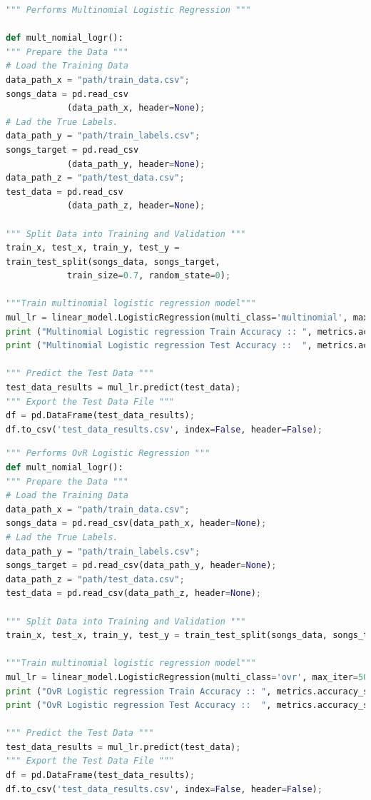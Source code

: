\documentclass[journal]{IEEEtran}
\begin{document}
\begin{lstlisting}[language=Python, caption = Multinomial LogisticRegression]
""" Performs Multinomial Logistic Regression """

def mult_nomial_logr():
""" Prepare the Data """
# Load the Training Data
data_path_x = "path/train_data.csv";
songs_data = pd.read_csv
			(data_path_x, header=None);
# Lad the True Labels.
data_path_y = "path/train_labels.csv";
songs_target = pd.read_csv
			(data_path_y, header=None);
data_path_z = "path/test_data.csv";
test_data = pd.read_csv
			(data_path_z, header=None);

""" Split Data into Training and Validation """
train_x, test_x, train_y, test_y = 
train_test_split(songs_data, songs_target, 
			train_size=0.7, random_state=0);

"""Train multinomial logistic regression model"""
mul_lr = linear_model.LogisticRegression(multi_class='multinomial', max_iter=500, solver='netwon-cg').fit(train_x, train_y);
print ("Multinomial Logistic regression Train Accuracy :: ", metrics.accuracy_score(train_y, mul_lr.predict(train_x)));
print ("Multinomial Logistic regression Test Accuracy ::  ", metrics.accuracy_score(test_y, mul_lr.predict(test_x)));

""" Predict the Test Data """
test_data_results = mul_lr.predict(test_data);
""" Export the Test Data File """
df = pd.DataFrame(test_data_results);
df.to_csv('test_data_results.csv', index=False, header=False);
\end{lstlisting}
\begin{lstlisting}[language=Python, caption = OvR LogisticRegression]
""" Performs OvR Logistic Regression """
def mult_nomial_logr():
""" Prepare the Data """
# Load the Training Data
data_path_x = "path/train_data.csv";
songs_data = pd.read_csv(data_path_x, header=None);
# Lad the True Labels.
data_path_y = "path/train_labels.csv";
songs_target = pd.read_csv(data_path_y, header=None);
data_path_z = "path/test_data.csv";
test_data = pd.read_csv(data_path_z, header=None);

""" Split Data into Training and Validation """
train_x, test_x, train_y, test_y = train_test_split(songs_data, songs_target, train_size=0.7, random_state=0);

"""Train multinomial logistic regression model"""
mul_lr = linear_model.LogisticRegression(multi_class='ovr', max_iter=500, solver='netwon-cg').fit(train_x, train_y);
print ("OvR Logistic regression Train Accuracy :: ", metrics.accuracy_score(train_y, mul_lr.predict(train_x)));
print ("OvR Logistic regression Test Accuracy ::  ", metrics.accuracy_score(test_y, mul_lr.predict(test_x)));

""" Predict the Test Data """
test_data_results = mul_lr.predict(test_data);
""" Export the Test Data File """
df = pd.DataFrame(test_data_results);
df.to_csv('test_data_results.csv', index=False, header=False);
\end{lstlisting}
\end{document}
